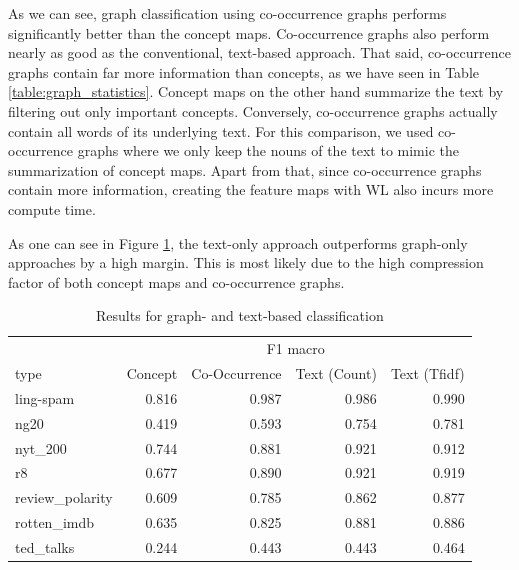 As we can see, graph classification using co-occurrence graphs performs significantly better than the concept maps.
Co-occurrence graphs also perform nearly as good as the conventional, text-based approach.
That said, co-occurrence graphs contain far more information than concepts, as we have seen in Table \ref{table:graph_statistics}.
Concept maps on the other hand summarize the text by filtering out only important concepts.
Conversely, co-occurrence graphs actually contain all words of its underlying text.
For this comparison, we used co-occurrence graphs where we only keep the nouns of the text to mimic the summarization of concept maps.
Apart from that, since co-occurrence graphs contain more information, creating the feature maps with WL also incurs more compute time.


As one can see in Figure \ref{fig:results_cmap_vs_text}, the text-only approach outperforms graph-only approaches by a high margin.
This is most likely due to the high compression factor of both concept maps and co-occurrence graphs.

\begin{table}[htb!]
	\centering
	\begin{tabular}{lrrrr}
		\toprule
		 & \multicolumn{4}{c}{F1 macro} \\
		type &  Concept &  Co-Occurrence & Text (Count) & Text (Tfidf) \\
		\midrule
		ling-spam       & 0.816 & 0.987 & 0.986 & 0.990 \\
		ng20            & 0.419 & 0.593 & 0.754 & 0.781 \\
		nyt\_200         & 0.744 & 0.881 & 0.921 & 0.912 \\
		r8              & 0.677 & 0.890 & 0.921 & 0.919 \\
		review\_polarity & 0.609 & 0.785 & 0.862 & 0.877 \\
		rotten\_imdb     & 0.635 & 0.825 & 0.881 & 0.886 \\
		ted\_talks       & 0.244 & 0.443 & 0.443 & 0.464 \\
		\bottomrule
	\end{tabular}
	\caption[Results: Concept Maps vs. Text]{Results for graph- and text-based classification}
	\label{fig:results_cmap_vs_text}
\end{table}

